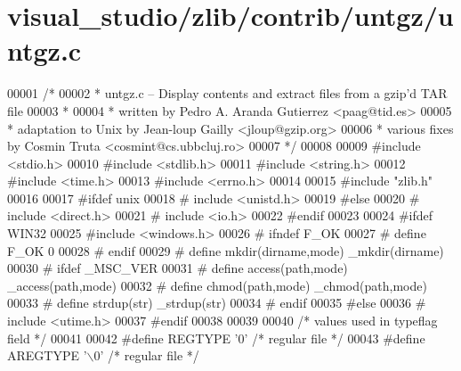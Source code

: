 \hypertarget{visual__studio_2zlib_2contrib_2untgz_2untgz_8c_source}{}\section{visual\+\_\+studio/zlib/contrib/untgz/untgz.c}
\label{visual__studio_2zlib_2contrib_2untgz_2untgz_8c_source}

\begin{DoxyCode}
00001 \textcolor{comment}{/*}
00002 \textcolor{comment}{ * untgz.c -- Display contents and extract files from a gzip'd TAR file}
00003 \textcolor{comment}{ *}
00004 \textcolor{comment}{ * written by Pedro A. Aranda Gutierrez <paag@tid.es>}
00005 \textcolor{comment}{ * adaptation to Unix by Jean-loup Gailly <jloup@gzip.org>}
00006 \textcolor{comment}{ * various fixes by Cosmin Truta <cosmint@cs.ubbcluj.ro>}
00007 \textcolor{comment}{ */}
00008 
00009 \textcolor{preprocessor}{#include <stdio.h>}
00010 \textcolor{preprocessor}{#include <stdlib.h>}
00011 \textcolor{preprocessor}{#include <string.h>}
00012 \textcolor{preprocessor}{#include <time.h>}
00013 \textcolor{preprocessor}{#include <errno.h>}
00014 
00015 \textcolor{preprocessor}{#include "zlib.h"}
00016 
00017 \textcolor{preprocessor}{#ifdef unix}
00018 \textcolor{preprocessor}{#  include <unistd.h>}
00019 \textcolor{preprocessor}{#else}
00020 \textcolor{preprocessor}{#  include <direct.h>}
00021 \textcolor{preprocessor}{#  include <io.h>}
00022 \textcolor{preprocessor}{#endif}
00023 
00024 \textcolor{preprocessor}{#ifdef WIN32}
00025 \textcolor{preprocessor}{#include <windows.h>}
00026 \textcolor{preprocessor}{#  ifndef F\_OK}
00027 \textcolor{preprocessor}{#    define F\_OK  0}
00028 \textcolor{preprocessor}{#  endif}
00029 \textcolor{preprocessor}{#  define mkdir(dirname,mode)   \_mkdir(dirname)}
00030 \textcolor{preprocessor}{#  ifdef \_MSC\_VER}
00031 \textcolor{preprocessor}{#    define access(path,mode)   \_access(path,mode)}
00032 \textcolor{preprocessor}{#    define chmod(path,mode)    \_chmod(path,mode)}
00033 \textcolor{preprocessor}{#    define strdup(str)         \_strdup(str)}
00034 \textcolor{preprocessor}{#  endif}
00035 \textcolor{preprocessor}{#else}
00036 \textcolor{preprocessor}{#  include <utime.h>}
00037 \textcolor{preprocessor}{#endif}
00038 
00039 
00040 \textcolor{comment}{/* values used in typeflag field */}
00041 
00042 \textcolor{preprocessor}{#define REGTYPE  '0'            }\textcolor{comment}{/* regular file */}\textcolor{preprocessor}{}
00043 \textcolor{preprocessor}{#define AREGTYPE '\(\backslash\)0'           }\textcolor{comment}{/* regular file */}\textcolor{preprocessor}{}

\end{DoxyCode}
